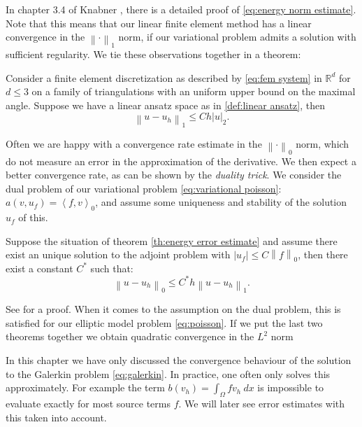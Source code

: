 \documentclass[../Main/main.tex]{subfiles}
\begin{document}
	In chapter 3.4 of Knabner \cite{Knabner}, there is a detailed proof of \eqref{eq:energy norm estimate}.\\
	Note that this means that our linear finite element method has a linear convergence in the $\left \| \cdot \right \|_1$ norm, if our variational problem admits a solution with sufficient regularity. We tie these observations together in a theorem:
	\begin{theorem}\label{th:energy error estimate}
		Consider a finite element discretization as described by \eqref{eq:fem system} in $\mathbb{R}^d$ for $d\leq 3$ on a family of triangulations with an uniform upper bound on the maximal angle. Suppose we have a linear ansatz space as in \ref{def:linear ansatz}, then
		\begin{equation}
			\left \| u-u_h \right \|_{1}\leq C h|u|_{2}.
		\end{equation}
	\end{theorem}
	Often we are happy with a convergence rate estimate in the $\left \| \cdot \right \|_0$ norm, which do not measure an error in the approximation of the derivative. We then expect a better convergence rate, as can be shown by the \emph{duality trick}. We consider the dual problem of our variational problem \eqref{eq:variational poisson}: $a(v,u_f) = \left \langle f,v\right \rangle_0$, and assume some uniqueness and stability of the solution $u_f$ of this. 
	\begin{theorem}[$L^2$ estimate]
		Suppose the situation of theorem \ref{th:energy error estimate} and assume there exist an unique solution to the adjoint problem with $| u_f| \leq C \left \|f \right \|_0$, then there exist a constant $C^*$ such that:
		\begin{equation}
			\left \| u - u_h \right \|_0 \leq C^* h \left \| u- u_h \right \|_1.
		\end{equation}
	\end{theorem}
	See \cite{Knabner} for a proof. When it comes to the assumption on the dual problem, this is satisfied for our elliptic model problem \ref{eq:poisson}. If we put the last two theorems together we obtain quadratic convergence in the $L^2$ norm
	\begin{remark}
		In this chapter we have only discussed the convergence behaviour of the solution to the Galerkin problem \eqref{eq:galerkin}. In practice, one often only solves this approximately. For example the term  $b(v_h)=\int_{\Omega}fv_h \ dx$ is impossible to evaluate exactly for most source terms $f$. We will later see error estimates with this taken into account.
	\end{remark}
\end{document}
